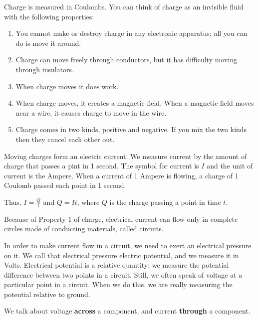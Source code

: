 \documentclass{article}
\begin{document}
\pagecolor{black}
\color{white}


    Charge is measured in Coulombs. You can think of charge as an invisible fluid with the following properties:
    \begin{enumerate}
        \item You cannot make or destroy charge in any electronic apparatus; all you can do is move it around.
        \item Charge can move freely through conductors, but it has difficulty moving through insulators.
        \item When charge moves it does work.
        \item When charge moves, it creates a magnetic field. When a magnetic field moves near a wire, it causes charge to move in the wire.
        \item Charge comes in two kinds, positive and negative. If you mix the two kinds then they cancel each other out.
    \end{enumerate}

\medskip
{}

    Moving charges form an electric current. We measure current by the amount of charge that passes a pint in 1 second. The symbol for current is $I$ and the unit of current is the Ampere. When a current of 1 Ampere is flowing, a charge of 1 Coulomb passed each point in 1 second.

    Thus, $I=\frac Qt$ and $Q = It$, where $Q$ is the charge passing a point in time $t$.

\medskip
{}

    Because of Property 1 of charge, electrical current can flow only in complete circles made of conducting materials, called circuits.

\medskip
{}

    In order to make current flow in a circuit, we need to exert an electrical pressure on it. We call that electrical pressure electric potential, and we measure it in Volts. Electrical potential is a relative quantity; we measure the potential difference between two points in a circuit. Still, we often speak of voltage at a particular point in a circuit. When we do this, we are really measuring the potential relative to ground.

    We talk about voltage {\bf across} a component, and current {\bf through} a component.

\medskip
{}
\end{document}
